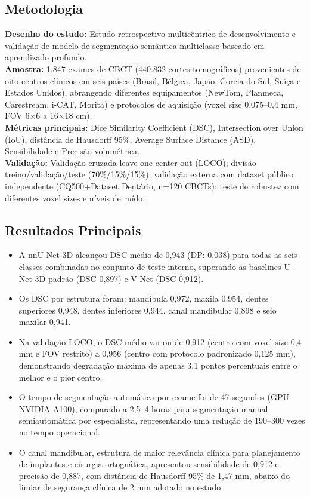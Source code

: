 \subsection{Metodologia}
\textbf{Desenho do estudo:} Estudo retrospectivo multicêntrico de
desenvolvimento e validação de modelo de segmentação semântica
multiclasse baseado em aprendizado profundo. \\
\textbf{Amostra:} 1.847 exames de CBCT (440.832 cortes tomográficos)
provenientes de oito centros clínicos em seis países (Brasil, Bélgica,
Japão, Coreia do Sul, Suíça e Estados Unidos), abrangendo diferentes
equipamentos (NewTom, Planmeca, Carestream, i-CAT, Morita) e protocolos
de aquisição (voxel size 0,075--0,4 mm, FOV 6$\times$6 a 16$\times$18 cm). \\
\textbf{Métricas principais:} Dice Similarity Coefficient (DSC),
Intersection over Union (IoU), distância de Hausdorff 95\%, Average
Surface Distance (ASD), Sensibilidade e Precisão volumétrica. \\
\textbf{Validação:} Validação cruzada leave-one-center-out (LOCO);
divisão treino/validação/teste (70\%/15\%/15\%); validação externa com
dataset público independente (CQ500+Dataset Dentário, n=120 CBCTs);
teste de robustez com diferentes voxel sizes e níveis de ruído.

\subsection{Resultados Principais}
\begin{itemize}
  \item A nnU-Net 3D alcançou DSC médio de 0,943 (DP: 0,038) para todas
        as seis classes combinadas no conjunto de teste interno,
        superando as baselines U-Net 3D padrão (DSC 0,897) e V-Net
        (DSC 0,912).
  \item Os DSC por estrutura foram: mandíbula 0,972, maxila 0,954,
        dentes superiores 0,948, dentes inferiores 0,944, canal
        mandibular 0,898 e seio maxilar 0,941.
  \item Na validação LOCO, o DSC médio variou de 0,912 (centro com
        voxel size 0,4 mm e FOV restrito) a 0,956 (centro com
        protocolo padronizado 0,125 mm), demonstrando degradação
        máxima de apenas 3,1 pontos percentuais entre o melhor e o
        pior centro.
  \item O tempo de segmentação automática por exame foi de 47 segundos
        (GPU NVIDIA A100), comparado a 2,5--4 horas para segmentação
        manual semiautomática por especialista, representando uma
        redução de 190--300 vezes no tempo operacional.
  \item O canal mandibular, estrutura de maior relevância clínica para
        planejamento de implantes e cirurgia ortognática, apresentou
        sensibilidade de 0,912 e precisão de 0,887, com distância de
        Hausdorff 95\% de 1,47 mm, abaixo do limiar de segurança
        clínica de 2 mm adotado no estudo.
\end{itemize}

